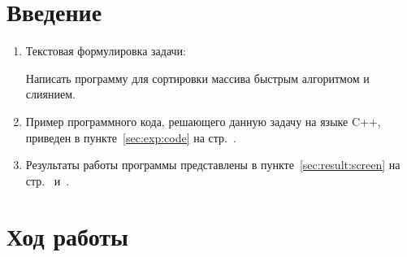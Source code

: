 \documentclass[12pt,a4paper]{scrartcl}
\begin{document}
	\section{Введение}
	\label{sec:intro}
	\begin{enumerate}
	\item Текстовая формулировка задачи:
	
	Написать программу для сортировки массива быстрым алгоритмом и слиянием.
	\item Пример программного кода, решающего данную задачу на языке C++, приведен в пункте~\ref{sec:exp:code} на стр.~\pageref{sec:exp:code}.
	\item Результаты работы программы представлены в пункте~\ref{sec:result:screen} на стр.~\pageref{figure1:screen} и~\pageref{figure2:screen}.
	\end{enumerate}
	
	\section{Ход работы}
	\label{sec:exp}
	
\end{document}
